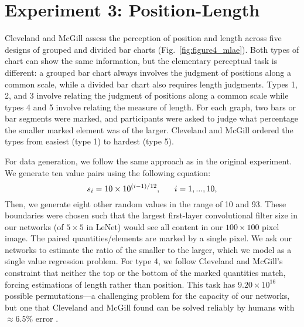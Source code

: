 \section{Experiment 3: Position-Length}
\label{sec:positionlength}

Cleveland and McGill assess the perception of position and length across five designs of grouped and divided bar charts (Fig.~\ref{fig:figure4_mlae}). Both types of chart can show the same information, but the elementary perceptual task is different: a grouped bar chart always involves the judgment of positions along a common scale, while a divided bar chart also requires length judgments. Types 1, 2, and 3 involve relating the judgment of positions along a common scale while types 4 and 5 involve relating the measure of length. For each graph, two bars or bar segments were marked, and participants were asked to judge what percentage the smaller marked element was of the larger. Cleveland and McGill ordered the types from easiest (type 1) to hardest (type 5).

\setlength{\belowdisplayskip}{3pt} \setlength{\belowdisplayshortskip}{3pt}
\setlength{\abovedisplayskip}{3pt} \setlength{\abovedisplayshortskip}{3pt}

For data generation, we follow the same approach as in the original experiment. We generate ten value pairs using the following equation:
\begin{equation}
s_i = 10\times10^{(i-1)/12},\textnormal{~~~~~}i=1,...,10,
\end{equation}
Then, we generate eight other random values in the range of 10 and 93. These boundaries were chosen such that the largest first-layer convolutional filter size in our networks (of $5\times5$ in LeNet) would see all content in our $100\times100$ pixel image. The paired quantities/elements are marked by a single pixel. We ask our networks to estimate the ratio of the smaller to the larger, which we model as a single value regression problem. For type 4, we follow Cleveland and McGill's constraint that neither the top or the bottom of the marked quantities match, forcing estimations of length rather than position. This task has $9.20\times10^{16}$ possible permutations---a challenging problem for the capacity of our networks, but one that Cleveland and McGill found can be solved reliably by humans with $\approx6.5\%$ error \cite{cleveland_mcgill}.


